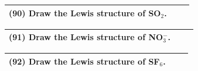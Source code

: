 \documentclass{article}
\begin{document}
\noindent
\begin{tabular}{|p{0.9\linewidth}|}
\hline
\vspace{0.2cm}
\textbf{(90)} Draw the Lewis structure of SO$_2$. \\
\hline
\end{tabular}
\vspace{0.2cm}

\noindent
\begin{tabular}{|p{0.9\linewidth}|}
\hline
\vspace{0.2cm}
\textbf{(91)} Draw the Lewis structure of NO$_3^-$. \\
\hline
\end{tabular}
\vspace{0.2cm}

\noindent
\begin{tabular}{|p{0.9\linewidth}|}
\hline
\vspace{0.2cm}
\textbf{(92)} Draw the Lewis structure of SF$_6$. \\
\hline
\end{tabular}
\vspace{0.2cm}
\end{document}
